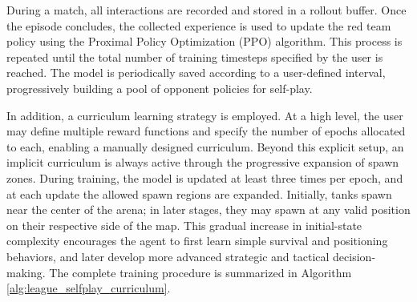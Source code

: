 \documentclass[conf]{new-aiaa}
\begin{document}
During a match, all interactions are recorded and stored in a rollout buffer. Once the episode concludes, the collected experience is used to update the red team policy using the Proximal Policy Optimization (PPO) \cite{PPO} algorithm. This process is repeated until the total number of training timesteps specified by the user is reached. The model is periodically saved according to a user-defined interval, progressively building a pool of opponent policies for self-play.

In addition, a curriculum learning \cite{CVLEARNING} strategy is employed. At a high level, the user may define multiple reward functions and specify the number of epochs allocated to each, enabling a manually designed curriculum. Beyond this explicit setup, an implicit curriculum is always active through the progressive expansion of spawn zones. During training, the model is updated at least three times per epoch, and at each update the allowed spawn regions are expanded. Initially, tanks spawn near the center of the arena; in later stages, they may spawn at any valid position on their respective side of the map. This gradual increase in initial-state complexity encourages the agent to first learn simple survival and positioning behaviors, and later develop more advanced strategic and tactical decision-making. The complete training procedure is summarized in Algorithm \ref{alg:league_selfplay_curriculum}.
\end{document}
